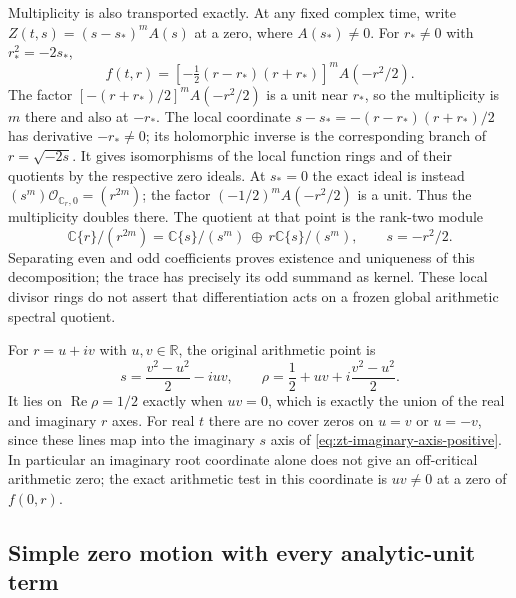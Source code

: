 Multiplicity is also transported exactly.  At any fixed complex time,
write $Z(t,s)=(s-s_*)^mA(s)$ at a zero, where $A(s_*)\ne0$.
For $r_*\ne0$ with $r_*^2=-2s_*$,
\[
 f(t,r)=\left[-\tfrac12(r-r_*)(r+r_*)\right]^m A(-r^2/2).
\]
The factor $[-(r+r_*)/2]^mA(-r^2/2)$ is a unit near $r_*$,
so the multiplicity is $m$ there and also at $-r_*$.  The local
coordinate $s-s_*=-(r-r_*)(r+r_*)/2$ has derivative $-r_*\ne0$;
its holomorphic inverse is the corresponding branch of
$r=\sqrt{-2s}$.  It gives isomorphisms of the local function rings
and of their quotients by the respective zero ideals.  At $s_*=0$
the exact ideal is instead
$(s^m)\mathcal O_{\mathbb C_r,0}=(r^{2m})$; the factor
$(-1/2)^mA(-r^2/2)$ is a unit.  Thus the multiplicity doubles there.
The quotient at that point is the rank-two module
\[
 \mathbb C\{r\}/(r^{2m})
   =\mathbb C\{s\}/(s^m)\ \oplus\ r\mathbb C\{s\}/(s^m),
 \qquad s=-r^2/2.
\]
Separating even and odd coefficients proves existence and uniqueness
of this decomposition; the trace has precisely its odd summand as
kernel.  These local divisor rings do not assert that differentiation
acts on a frozen global arithmetic spectral quotient.

For $r=u+iv$ with $u,v\in\mathbb R$, the original arithmetic point is
\begin{equation}
 s=\frac{v^2-u^2}{2}-iuv,\qquad
 \rho=\frac12+uv+i\frac{v^2-u^2}{2}.
 \label{eq:zt-critical-coordinate}
\end{equation}
It lies on $\operatorname{Re}\rho=1/2$ exactly when $uv=0$,
which is exactly the union of the real and imaginary $r$ axes.
For real $t$ there are no cover zeros on $u=v$ or $u=-v$, since
these lines map into the imaginary $s$ axis of
\eqref{eq:zt-imaginary-axis-positive}.  In particular an imaginary
root coordinate alone does not give an off-critical arithmetic zero;
the exact arithmetic test in this coordinate is $uv\ne0$ at a zero
of $f(0,r)$.

\subsection{Simple zero motion with every analytic-unit term}

